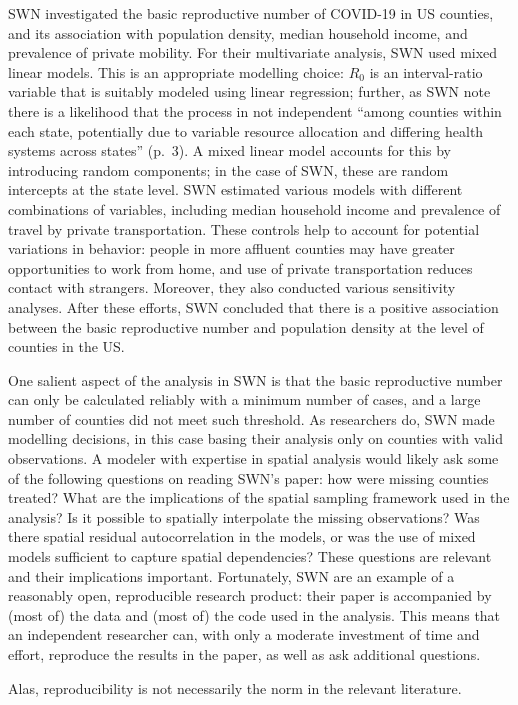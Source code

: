 \documentclass[preprint, 3p,
authoryear]{elsarticle} %
\begin{document}
SWN investigated the basic reproductive number of COVID-19 in US
counties, and its association with population density, median household
income, and prevalence of private mobility. For their multivariate
analysis, SWN used mixed linear models. This is an appropriate modelling
choice: \(R_0\) is an interval-ratio variable that is suitably modeled
using linear regression; further, as SWN note there is a likelihood that
the process in not independent ``among counties within each state,
potentially due to variable resource allocation and differing health
systems across states'' (p.~3). A mixed linear model accounts for this
by introducing random components; in the case of SWN, these are random
intercepts at the state level. SWN estimated various models with
different combinations of variables, including median household income
and prevalence of travel by private transportation. These controls help
to account for potential variations in behavior: people in more affluent
counties may have greater opportunities to work from home, and use of
private transportation reduces contact with strangers. Moreover, they
also conducted various sensitivity analyses. After these efforts, SWN
concluded that there is a positive association between the basic
reproductive number and population density at the level of counties in
the US.

One salient aspect of the analysis in SWN is that the basic reproductive
number can only be calculated reliably with a minimum number of cases,
and a large number of counties did not meet such threshold. As
researchers do, SWN made modelling decisions, in this case basing their
analysis only on counties with valid observations. A modeler with
expertise in spatial analysis would likely ask some of the following
questions on reading SWN's paper: how were missing counties treated?
What are the implications of the spatial sampling framework used in the
analysis? Is it possible to spatially interpolate the missing
observations? Was there spatial residual autocorrelation in the models,
or was the use of mixed models sufficient to capture spatial
dependencies? These questions are relevant and their implications
important. Fortunately, SWN are an example of a reasonably open,
reproducible research product: their paper is accompanied by (most of)
the data and (most of) the code used in the analysis. This means that an
independent researcher can, with only a moderate investment of time and
effort, reproduce the results in the paper, as well as ask additional
questions.

Alas, reproducibility is not necessarily the norm in the relevant
literature.
\end{document}
